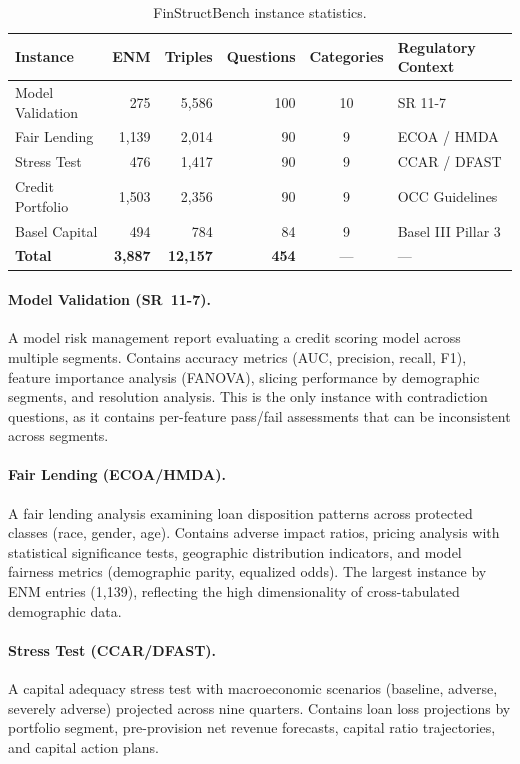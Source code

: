 \documentclass[11pt]{article}
\begin{document}
\begin{table}[t]
\centering
\caption{FinStructBench instance statistics.}
\label{tab:instances}
\small
\begin{tabular}{lrrrcl}
\toprule
Instance & ENM & Triples & Questions & Categories & Regulatory Context \\
\midrule
Model Validation & 275 & 5{,}586 & 100 & 10 & SR 11-7 \\
Fair Lending & 1{,}139 & 2{,}014 & 90 & 9 & ECOA / HMDA \\
Stress Test & 476 & 1{,}417 & 90 & 9 & CCAR / DFAST \\
Credit Portfolio & 1{,}503 & 2{,}356 & 90 & 9 & OCC Guidelines \\
Basel Capital & 494 & 784 & 84 & 9 & Basel III Pillar 3 \\
\midrule
\textbf{Total} & \textbf{3{,}887} & \textbf{12{,}157} & \textbf{454} & --- & --- \\
\bottomrule
\end{tabular}
\end{table}

\paragraph{Model Validation (SR~11-7).}
A model risk management report evaluating a credit scoring model across
multiple segments.  Contains accuracy metrics (AUC, precision, recall, F1),
feature importance analysis (FANOVA), slicing performance by demographic
segments, and resolution analysis.  This is the only instance with
contradiction questions, as it contains per-feature pass/fail assessments
that can be inconsistent across segments.

\paragraph{Fair Lending (ECOA/HMDA).}
A fair lending analysis examining loan disposition patterns across protected
classes (race, gender, age).  Contains adverse impact ratios, pricing
analysis with statistical significance tests, geographic distribution
indicators, and model fairness metrics (demographic parity, equalized odds).
The largest instance by ENM entries (1{,}139), reflecting the high dimensionality
of cross-tabulated demographic data.

\paragraph{Stress Test (CCAR/DFAST).}
A capital adequacy stress test with macroeconomic scenarios (baseline,
adverse, severely adverse) projected across nine quarters.  Contains loan
loss projections by portfolio segment, pre-provision net revenue forecasts,
capital ratio trajectories, and capital action plans.
\end{document}
